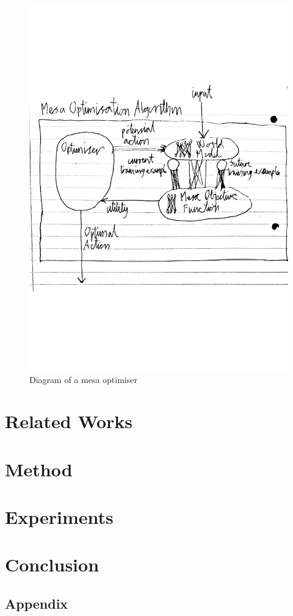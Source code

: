 \documentclass[11pt]{article}
\begin{document}
\begin{figure}[htbp]
        \centering
        \includegraphics[width=\linewidth]{mesaoptdiagram}
        \caption{Diagram of a mesa optimiser}
        \label{fig:figure1}
    \end{figure}
\section{Related Works}\label{sec:relatedworks}

\section{Method}\label{sec:method}

\section{Experiments}\label{sec:experiments}

\section{Conclusion}\label{sec:conclusion}



\begin{appendix}
    \section*{Appendix}
\end{appendix}
\end{document}
